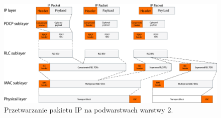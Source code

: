 \begin{figure}
	\centerline{\includegraphics[width=1.0\textwidth]{images/pdu_overview.png}}
	\caption{Przetwarzanie pakietu IP na podwarstwach warstwy 2.}
	\label{fig:ip_through_layers}
\end{figure}
